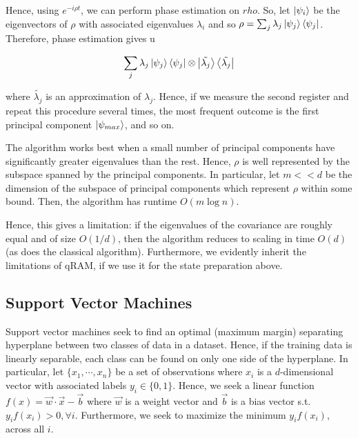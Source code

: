 \documentclass[12]{amsart}
\newcommand\0{\mathbf{0}}
\newcommand\<{\langle}
\renewcommand\>{\rangle}
\begin{document}
Hence, using $e^{-i \rho t}$, we can perform phase estimation on $rho$. So, let $\ket{\psi_i}$ be the eigenvectors of $\rho$ with associated eigenvalues $\lambda_i$ and so $\rho = \sum_j \lambda_j \ket{\psi_j}\bra{\psi_j}$. Therefore, phase estimation gives u

\begin{align*}
\sum_j \lambda_j \ket{\psi_j}\bra{\psi_j} \otimes \ket{\tilde{\lambda_j}} \bra{\tilde{\lambda_j}}
\end{align*}

where $\tilde{\lambda_j}$ is an approximation of $\lambda_j$. Hence, if we measure the second register and repeat this procedure several times, the most frequent outcome is the first principal component $\ket{\psi_{max}}$, and so on.

The algorithm works best when a small number of principal components have significantly greater eigenvalues than the rest. Hence, $\rho$ is well represented by the subspace spanned by the principal components. In particular, let $m << d$ be the dimension of the subspace of principal components which represent $\rho$ within some bound. Then, the algorithm has runtime $O(m \log n )$. 

Hence, this gives a limitation: if the eigenvalues of the covariance are roughly equal and of size $O(1/d)$, then the algorithm reduces to scaling in time $O(d)$ (as does the classical algorithm). Furthermore, we evidently inherit the limitations of qRAM, if we use it for the state preparation above.  

\subsection{Support Vector Machines}

Support vector machines seek to find an optimal (maximum margin) separating hyperplane between two classes of data in a dataset. Hence, if the training data is linearly separable, each class can be found on only one side of the hyperplane. In particular, let $\{ x_1 , \cdots , x_n \}$ be a set of observations where $x_i$ is a $d$-dimensional vector with associated labels $y_i \in \{ 0 , 1\}$. Hence, we seek a linear function $f(x) = \vec{w} \cdot \vec{x} - \vec{b}$ where $\vec{w}$ is a weight vector and $\vec{b}$ is a bias vector s.t. $y_if(x_i) > 0, \forall i$. Furthermore, we seek to maximize the minimum $y_i f(x_i)$, across all $i$. 
\end{document}

